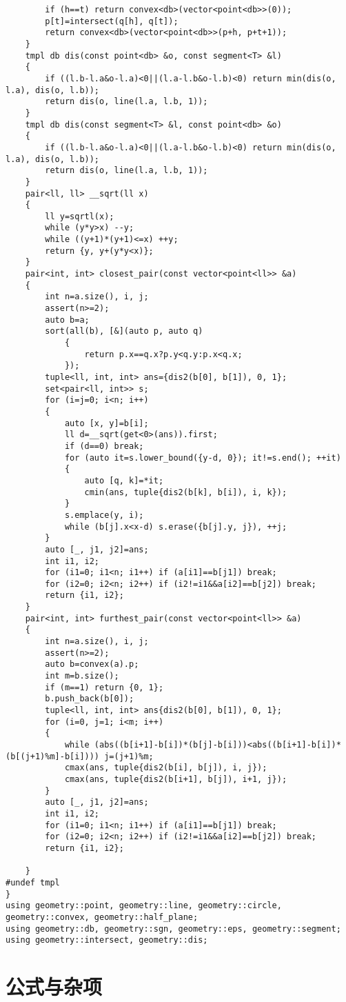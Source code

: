 \documentclass[12pt]{ctexart}
\begin{document}
\begin{lstlisting}
		if (h==t) return convex<db>(vector<point<db>>(0));
		p[t]=intersect(q[h], q[t]);
		return convex<db>(vector<point<db>>(p+h, p+t+1));
	}
	tmpl db dis(const point<db> &o, const segment<T> &l)
	{
		if ((l.b-l.a&o-l.a)<0||(l.a-l.b&o-l.b)<0) return min(dis(o, l.a), dis(o, l.b));
		return dis(o, line(l.a, l.b, 1));
	}
	tmpl db dis(const segment<T> &l, const point<db> &o)
	{
		if ((l.b-l.a&o-l.a)<0||(l.a-l.b&o-l.b)<0) return min(dis(o, l.a), dis(o, l.b));
		return dis(o, line(l.a, l.b, 1));
	}
	pair<ll, ll> __sqrt(ll x)
	{
		ll y=sqrtl(x);
		while (y*y>x) --y;
		while ((y+1)*(y+1)<=x) ++y;
		return {y, y+(y*y<x)};
	}
	pair<int, int> closest_pair(const vector<point<ll>> &a)
	{
		int n=a.size(), i, j;
		assert(n>=2);
		auto b=a;
		sort(all(b), [&](auto p, auto q)
			{
				return p.x==q.x?p.y<q.y:p.x<q.x;
			});
		tuple<ll, int, int> ans={dis2(b[0], b[1]), 0, 1};
		set<pair<ll, int>> s;
		for (i=j=0; i<n; i++)
		{
			auto [x, y]=b[i];
			ll d=__sqrt(get<0>(ans)).first;
			if (d==0) break;
			for (auto it=s.lower_bound({y-d, 0}); it!=s.end(); ++it)
			{
				auto [q, k]=*it;
				cmin(ans, tuple{dis2(b[k], b[i]), i, k});
			}
			s.emplace(y, i);
			while (b[j].x<x-d) s.erase({b[j].y, j}), ++j;
		}
		auto [_, j1, j2]=ans;
		int i1, i2;
		for (i1=0; i1<n; i1++) if (a[i1]==b[j1]) break;
		for (i2=0; i2<n; i2++) if (i2!=i1&&a[i2]==b[j2]) break;
		return {i1, i2};
	}
	pair<int, int> furthest_pair(const vector<point<ll>> &a)
	{
		int n=a.size(), i, j;
		assert(n>=2);
		auto b=convex(a).p;
		int m=b.size();
		if (m==1) return {0, 1};
		b.push_back(b[0]);
		tuple<ll, int, int> ans{dis2(b[0], b[1]), 0, 1};
		for (i=0, j=1; i<m; i++)
		{
			while (abs((b[i+1]-b[i])*(b[j]-b[i]))<abs((b[i+1]-b[i])*(b[(j+1)%m]-b[i]))) j=(j+1)%m;
			cmax(ans, tuple{dis2(b[i], b[j]), i, j});
			cmax(ans, tuple{dis2(b[i+1], b[j]), i+1, j});
		}
		auto [_, j1, j2]=ans;
		int i1, i2;
		for (i1=0; i1<n; i1++) if (a[i1]==b[j1]) break;
		for (i2=0; i2<n; i2++) if (i2!=i1&&a[i2]==b[j2]) break;
		return {i1, i2};

	}
#undef tmpl
}
using geometry::point, geometry::line, geometry::circle, geometry::convex, geometry::half_plane;
using geometry::db, geometry::sgn, geometry::eps, geometry::segment;
using geometry::intersect, geometry::dis;
\end{lstlisting}


\newpage

\section{公式与杂项}
\end{document}
